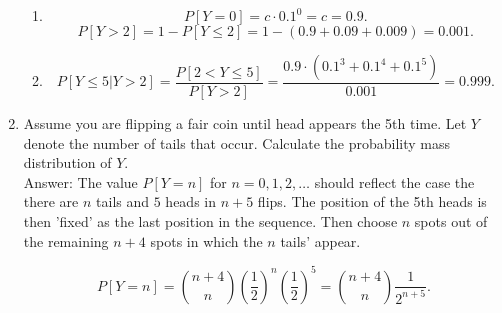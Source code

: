 \documentclass{article}
\begin{document}
\begin{enumerate}
\begin{enumerate}
\item

$$
P[Y = 0] = c \cdot 0.1^0 = c = 0.9.
$$
$$
P[Y > 2] = 1 - P[Y\leq 2] = 1- (0.9 +0.09 + 0.009) = 0.001.
$$

\item

$$
P[Y \leq 5 \vert Y > 2]
= \frac{P[2 < Y \leq 5]}{P[Y > 2]}
= \frac{0.9 \cdot (0.1^3 + 0.1^4 + 0.1^5)}{0.001}
= 0.999.
$$

\end{enumerate}

\item

Assume you are flipping a fair coin until head appears the 5th time. Let $Y$ denote the number of tails that occur. Calculate the probability mass distribution of $Y$. \\

Answer: The value $P[Y = n]$ for $n = 0,1,2,\dots$ should reflect the case the there are $n$ tails and $5$ heads in $n+5$ flips. The position of the 5th heads is then 'fixed' as the last position in the sequence. Then choose $n$ spots out of the remaining $n+4$ spots in which the $n$ tails' appear. 

$$
P[Y = n] = \binom{n+4}{n} \left(\frac{1}{2}\right)^n \left(\frac{1}{2}\right)^5 = \binom{n+4}{n} \frac{1}{2^{n+5}}.
$$


\end{enumerate}
\end{document}
